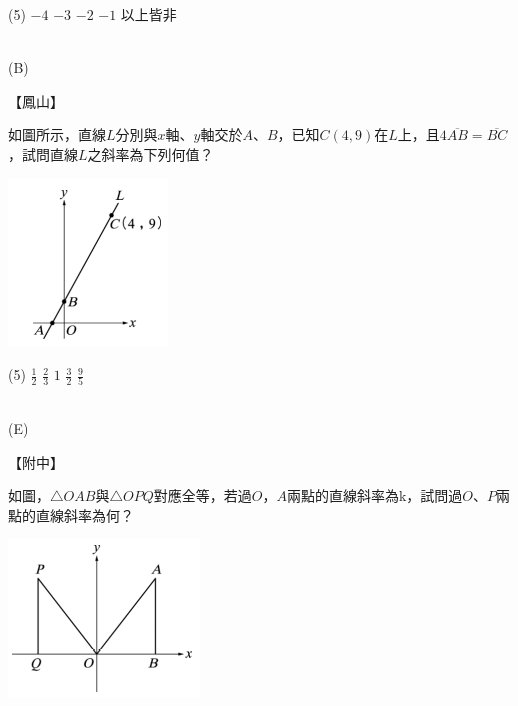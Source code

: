 \documentclass
[answers]
{exam}
\theoremstyle{definition}
\begin{document}
\begin{questions}
\begin{tasks}(5)
	\task $-4$
	\task $-3$
	\task $-2$
	\task $-1$
	\task 以上皆非
\end{tasks}

\begin{solution}~\\
	(B)
\end{solution}

\question
【鳳山】\\
\begin{minipage}[t]{0.7\linewidth}
	如圖所示，直線$L$分別與$x$軸、$y$軸交於$A$、$B$，已知$C\left( 4,9 \right)$在$L$上，且$4\overline{AB}=\overline{BC}$，試問直線$L$之斜率為下列何值？
\end{minipage}
\hfill
\begin{minipage}[t]{0.3\linewidth}
	\vspace*{-0.3cm}
	\includegraphics[scale=1]{./figure/7.png}
	\raggedleft %
\end{minipage}


\begin{tasks}(5)
	\task $\frac{1}{2}$
	\task $\frac{2}{3}$
	\task $1$
	\task $\frac{3}{2}$
	\task $\frac{9}{5}$
\end{tasks}
\begin{solution}~\\
	(E)
\end{solution}

\question
【附中】\\
\begin{minipage}[t]{0.7\linewidth}
	如圖，$\triangle OAB$與$\triangle OPQ$對應全等，若過$O$，$A$兩點的直線斜率為k，試問過$O$、$P$兩點的直線斜率為何？
\end{minipage}
\hfill
\begin{minipage}[t]{0.3\linewidth}
	\vspace*{-0.3cm}
	\includegraphics[scale=1]{./figure/8.png}
	\raggedleft %
\end{minipage}


\end{questions}
\end{document}
